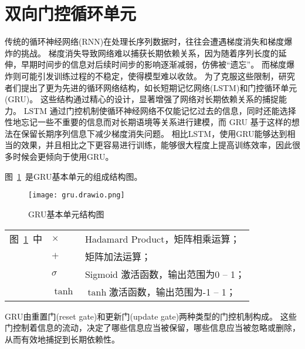 \section{双向门控循环单元}
传统的循环神经网络(RNN)在处理长序列数据时，往往会遭遇梯度消失和梯度爆炸的挑战。
梯度消失导致网络难以捕获长期依赖关系，因为随着序列长度的延伸，早期时间步的信息对后续时间步的影响逐渐减弱，仿佛被“遗忘”。
而梯度爆炸则可能引发训练过程的不稳定，使得模型难以收敛。
为了克服这些限制，研究者们提出了更为先进的循环网络结构，如长短期记忆网络(LSTM)\cite{memory2010long}和门控循环单元(GRU)\cite{cho2014learning}。
这些结构通过精心的设计，显著增强了网络对长期依赖关系的捕捉能力。
LSTM 通过门控机制使循环神经网络不仅能记忆过去的信息，同时还能选择性地忘记一些不重要的信息而对长期语境等关系进行建模，而 GRU 基于这样的想法在保留长期序列信息下减少梯度消失问题。
相比LSTM，使用GRU能够达到相当的效果，并且相比之下更容易进行训练，能够很大程度上提高训练效率，因此很多时候会更倾向于使用GRU。

图~\ref{fig:GRUunit}~是GRU基本单元的组成结构图。
\begin{figure}[h] 
  \centering
  \texttt{[image: gru.drawio.png]}
  \caption{GRU基本单元结构图}
  \label{fig:GRUunit}
\end{figure}
\begin{flushleft}
  \renewcommand\arraystretch{1.25}
  \begin{tabularx}{\textwidth}{@{}>{\normalsize\rm}l@{\quad}>{\normalsize\rm}l@{——}>{\normalsize\rm}X@{}}
  图~\ref{fig:GRUunit}~中
  &  $\times$ &Hadamard Product，矩阵相乘运算；\\
  &  $+$ &矩阵加法运算；\\
  &  $σ$ &Sigmoid 激活函数，输出范围为0 -- 1；\\
  &  $\tanh$ & $\tanh$激活函数，输出范围为-1 -- 1；\\
  \end{tabularx}\vspace{.5ex}%
\end{flushleft}

GRU由重置门(reset gate)和更新门(update gate)两种类型的门控机制构成。
这些门控制着信息的流动，决定了哪些信息应当被保留，哪些信息应当被忽略或删除，从而有效地捕捉到长期依赖性。

